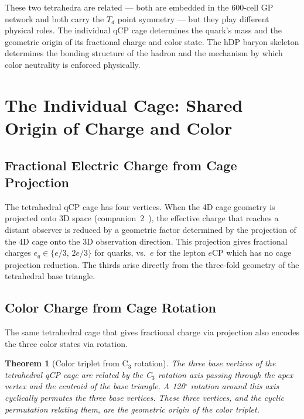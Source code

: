 \documentclass[12pt]{article}
\newtheorem{theorem}{Theorem}[section]
\newcommand{\eCP}{e\mathrm{CP}}
\newcommand{\Td}{T_d}
\begin{document}
These two tetrahedra are related --- both are embedded in the 600-cell
GP network and both carry the $\Td$ point symmetry --- but they play
different physical roles.  The individual qCP cage determines the
quark's mass and the geometric origin of its fractional charge and
color state.  The hDP baryon skeleton determines the bonding structure
of the hadron and the mechanism by which color neutrality is enforced
physically.

\section{The Individual Cage: Shared Origin of Charge and Color}
\label{sec:cage_and_color}

\subsection{Fractional Electric Charge from Cage Projection}

The tetrahedral qCP cage has four vertices.  When the 4D cage
geometry is projected onto 3D space (companion~2~\cite{c2}), the
effective charge that reaches a distant observer is reduced by a
geometric factor determined by the projection of the 4D cage onto
the 3D observation direction.  This projection gives fractional
charges $e_q \in \{e/3,\, 2e/3\}$ for quarks, vs.\ $e$ for the
lepton $\eCP$ which has no cage projection reduction.  The thirds
arise directly from the three-fold geometry of the tetrahedral base
triangle.

\subsection{Color Charge from Cage Rotation}

The same tetrahedral cage that gives fractional charge via projection
also encodes the three color states via rotation.

\begin{theorem}[Color triplet from C$_3$ rotation]
\label{thm:color_triplet}
The three base vertices of the tetrahedral qCP cage are related by
the C$_3$ rotation axis passing through the apex vertex and the
centroid of the base triangle.  A 120$^\circ$ rotation around this
axis cyclically permutes the three base vertices.  These three
vertices, and the cyclic permutation relating them, are the geometric
origin of the color triplet.
\end{theorem}
\end{document}
